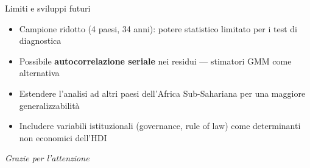 \documentclass[
  ignorenonframetext,
  aspectratio=43,
]{beamer}
\begin{document}
\begin{frame}{Limiti e sviluppi futuri}
\protect{}\label{limiti-e-sviluppi-futuri}
\begin{itemize}
  \item Campione ridotto (4 paesi, 34 anni): potere statistico limitato per i test di diagnostica
  \item Possibile \textbf{autocorrelazione seriale} nei residui — stimatori GMM come alternativa
  \item Estendere l'analisi ad altri paesi dell'Africa Sub-Sahariana per una maggiore generalizzabilità
  \item Includere variabili istituzionali (governance, rule of law) come determinanti non economici dell'HDI
\end{itemize}

\vspace{0.5em}
\begin{center}
\textit{Grazie per l'attenzione}
\end{center}
\end{frame}
\end{document}
